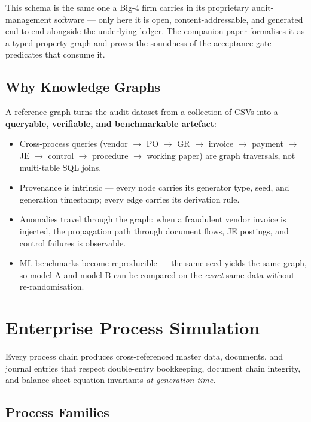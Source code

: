 \documentclass[11pt,a4paper]{article}
\begin{document}
This schema is the same one a Big-4 firm carries in its proprietary
audit-management software --- only here it is open, content-addressable, and
generated end-to-end alongside the underlying ledger. The companion paper
formalises it as a typed property graph and proves the soundness of the
acceptance-gate predicates that consume it.

\subsection{Why Knowledge Graphs}

A reference graph turns the audit dataset from a collection of CSVs into a
\textbf{queryable, verifiable, and benchmarkable artefact}:

\begin{itemize}[leftmargin=1.2em, itemsep=3pt]
  \item Cross-process queries (vendor $\to$ PO $\to$ GR $\to$ invoice $\to$
        payment $\to$ JE $\to$ control $\to$ procedure $\to$ working paper)
        are graph traversals, not multi-table SQL joins.
  \item Provenance is intrinsic --- every node carries its generator type,
        seed, and generation timestamp; every edge carries its derivation
        rule.
  \item Anomalies travel through the graph: when a fraudulent vendor
        invoice is injected, the propagation path through document flows,
        JE postings, and control failures is observable.
  \item ML benchmarks become reproducible --- the same seed yields the
        same graph, so model A and model B can be compared on the
        \emph{exact} same data without re-randomisation.
\end{itemize}

\newpage
\section{Enterprise Process Simulation}

Every process chain produces cross-referenced master data, documents, and
journal entries that respect double-entry bookkeeping, document chain
integrity, and balance sheet equation invariants \emph{at generation time}.

\subsection{Process Families}
\end{document}
